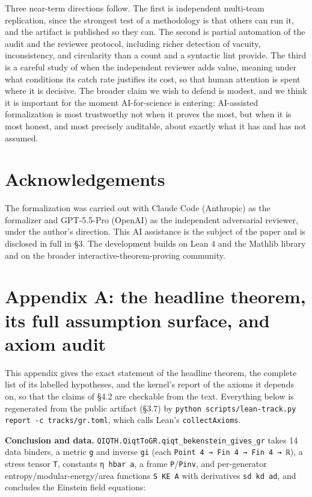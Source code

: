 \documentclass[11pt]{article}
\begin{document}
Three near-term directions follow. The first is independent multi-team replication, since the
strongest test of a methodology is that others can run it, and the artifact is published so they can.
The second is partial automation of the audit and the reviewer protocol, including richer detection
of vacuity, inconsistency, and circularity than a count and a syntactic lint provide. The third is a
careful study of when the independent reviewer adds value, meaning under what conditions its catch
rate justifies its cost, so that human attention is spent where it is decisive. The broader claim we
wish to defend is modest, and we think it is important for the moment AI-for-science is entering:
AI-assisted formalization is most trustworthy not when it proves the most, but when it is most
honest, and most precisely auditable, about exactly what it has and has not assumed.

\section*{Acknowledgements}

The formalization was carried out with Claude Code (Anthropic) as the formalizer and GPT-5.5-Pro
(OpenAI) as the independent adversarial reviewer, under the author's direction. This AI assistance
is the subject of the paper and is disclosed in full in §3. The development builds on Lean 4 and the
Mathlib library and on the broader interactive-theorem-proving community.

\section{Appendix A: the headline theorem, its full assumption surface, and axiom audit}

This appendix gives the exact statement of the headline theorem, the complete list of its labelled
hypotheses, and the kernel's report of the axioms it depends on, so that the claims of §4.2 are
checkable from the text. Everything below is regenerated from the public artifact (§3.7) by
\texttt{python scripts/lean-track.py report -c tracks/gr.toml}, which calls Lean's \texttt{collectAxioms}.

\textbf{Conclusion and data.} \texttt{QIQTH.QiqtToGR.qiqt\_bekenstein\_gives\_gr} takes 14 data binders, a metric
\texttt{g} and inverse \texttt{gi} (each \texttt{Point 4 → Fin 4 → Fin 4 → ℝ}), a stress tensor \texttt{T}, constants \texttt{η hbar a},
a frame \texttt{P}/\texttt{Pinv}, and per-generator entropy/modular-energy/area functions \texttt{S KE A} with derivatives
\texttt{sd kd ad}, and concludes the Einstein field equations:
\end{document}
